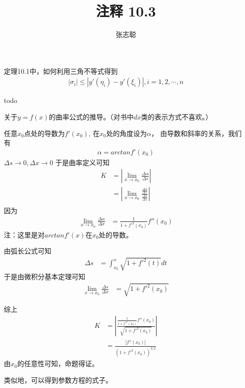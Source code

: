\documentclass{article}
\begin{document}
\title{注释 10.3}
\author{张志聪}
\maketitle

\begin{zremark}
  定理10.1中，如何利用三角不等式得到
  \begin{align*}
    |\sigma_i| \leq |y'(\eta_i) - y'(\xi_i)|, i = 1, 2, \cdots, n
  \end{align*}
\end{zremark}

todo

\begin{zremark}
  关于$y = f(x)$的曲率公式的推导。（对书中$dx$类的表示方式不喜欢。）
\end{zremark}

任意$x_0$点处的导数为$f'(x_0)$,
在$x_0$处的角度设为$\alpha$，
由导数和斜率的关系，我们有
\begin{align*}
  \alpha = arc tan f'(x_0)
\end{align*}
$\Delta s \to 0, \Delta x \to 0$
于是曲率定义可知
\begin{align*}
  K & = \left|\lim\limits_{x \to x_0} \frac{\Delta \alpha}{\Delta s}\right|                                   \\
    & = \left|\lim\limits_{x \to x_0} \frac{\frac{\Delta \alpha}{\Delta x}}{\frac{\Delta s}{\Delta x}}\right| \\
\end{align*}
因为
\begin{align*}
  \lim\limits_{x \to x_0} \frac{\Delta \alpha}{\Delta x}
   & = \frac{1}{1 + f'^2(x_0)} f''(x_0)
\end{align*}
注：这里是对$arc tan f'(x)$在$x_0$处的导数。

由弧长公式可知
\begin{align*}
  \Delta s & = \int_{x_0}^{x} \sqrt{1 + f'^2(t)} dt
\end{align*}
于是由微积分基本定理可知
\begin{align*}
  \lim\limits_{x \to x_0} \frac{\Delta s}{\Delta x}
   & = \sqrt{1 + f'^2(x_0)}
\end{align*}

综上
\begin{align*}
  K & = \left|\frac{\frac{1}{1 + f'^2(x_0)} f''(x_0)}{\sqrt{1 + f'^2(x_0)}}\right| \\
    & = \frac{|f''(x_0)|}{(1 + f'^2(x_0))^{3/2}}
\end{align*}
由$x_0$的任意性可知，命题得证。

类似地，可以得到参数方程的式子。
\end{document}
